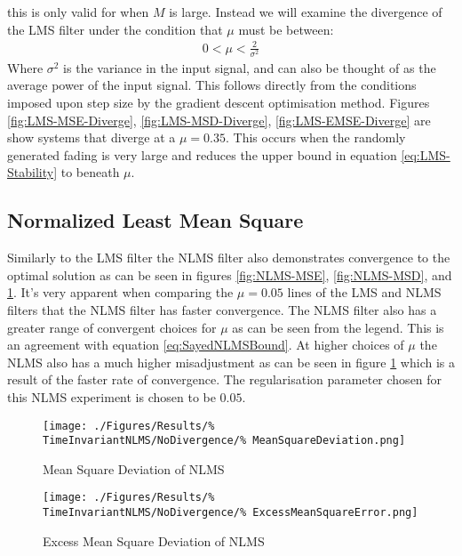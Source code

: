 this is only valid for when $M$ is large. Instead we will %
examine the divergence of the LMS filter under the %
condition that $\mu$ must be between:
\begin{align}
	0 < \mu < \frac{2}{\sigma^{2}}
	\label{eq:LMS-Stability}
\end{align}
Where $\sigma^{2}$ is the variance in the input signal, and can also %
be thought of as the average power of the input signal. This follows %
directly from the conditions imposed upon step size by the gradient %
descent optimisation method. Figures \ref{fig:LMS-MSE-Diverge}, %
\ref{fig:LMS-MSD-Diverge}, \ref{fig:LMS-EMSE-Diverge} are %
show systems that diverge at a $\mu = 0.35$. This occurs %
when the randomly generated fading is very large and reduces %
the upper bound in equation \ref{eq:LMS-Stability} to beneath %
$\mu$.
\FloatBarrier
\subsection{Normalized Least Mean Square}
\FloatBarrier
Similarly to the LMS filter the NLMS filter also demonstrates %
convergence to the optimal solution as can be %
seen in figures \ref{fig:NLMS-MSE}, \ref{fig:NLMS-MSD}, %
and \ref{fig:NLMS-EMSE}. It's very apparent when %
comparing the $\mu = 0.05$ lines of the LMS and NLMS filters %
that the NLMS filter has faster convergence. The NLMS filter %
also has a greater range of convergent choices for %
$\mu$ as can be seen from the legend. This is an agreement %
with equation \ref{eq:SayedNLMSBound}. At higher choices of %
$\mu$ the NLMS also has a much higher misadjustment as can be %
seen in figure \ref{fig:NLMS-EMSE} which is a result of the %
faster rate of convergence. The regularisation parameter chosen %
for this NLMS experiment is chosen to be $0.05$.
\begin{figure}[ht]
	\centering
	\begin{minipage}{0.49\textwidth}
		\texttt{[image: ./Figures/Results/\%
		TimeInvariantNLMS/NoDivergence/\%
		MeanSquareDeviation.png]}
		\captionsetup{width=0.75\linewidth}
		\caption{Mean Square Deviation of NLMS}
		\label{fig:NLMS-MSD}
	\end{minipage}
	\begin{minipage}{0.49\textwidth}
		\texttt{[image: ./Figures/Results/\%
		TimeInvariantNLMS/NoDivergence/\%
		ExcessMeanSquareError.png]}
		\captionsetup{width=0.75\linewidth}
		\caption{Excess Mean Square Deviation of NLMS}
		\label{fig:NLMS-EMSE}
	\end{minipage}
\end{figure}
